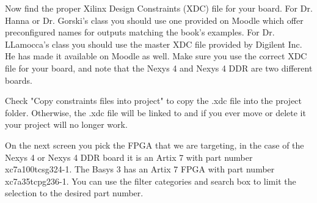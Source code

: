 Now find the proper Xilinx Design Constraints (XDC) file for your board.
For Dr. Hanna or Dr. Gorski's class you should use one provided on Moodle which offer
preconfigured names for outputs matching the book's examples.
For Dr. LLamocca's class you should use the master XDC file provided by Digilent Inc.
He has made it available on Moodle as well.
Make sure you use the correct XDC file for your board, and note that the Nexys 4 and Nexys 4 DDR
are two different boards.

Check "Copy constraints files into project" to copy the .xdc file into the project folder.
Otherwise, the .xdc file will be linked to and if you ever move or delete it your project
will no longer work.

\begin{center}
\end{center}

On the next screen you pick the FPGA that we are targeting, in the case of the Nexys 4 or
Nexys 4 DDR board it is an Artix 7 with part number xc7a100tcsg324-1.
The Basys 3 has an Artix 7 FPGA with part number xc7a35tcpg236-1.
You can use the filter categories and search box to limit the selection to the desired part number.

\begin{center}
\end{center}

